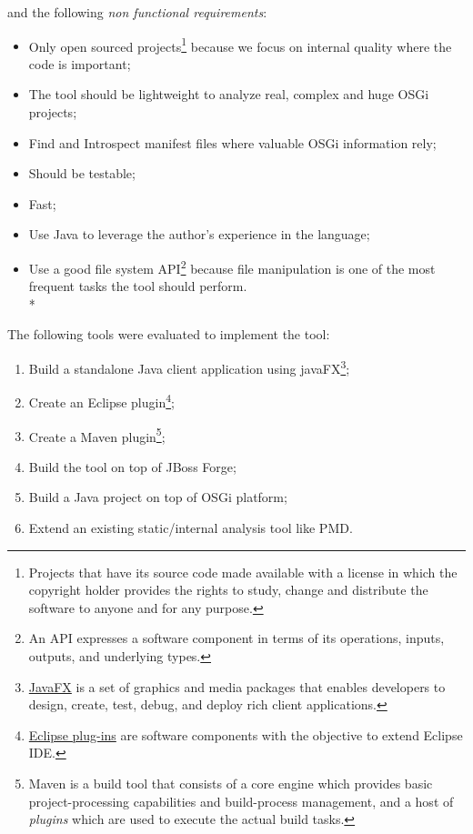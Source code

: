 and the following \emph{non functional requirements}:

\begin{itemize}
\item Only open sourced projects\footnote{Projects that have its source code made available with a license in which the copyright holder provides the rights to study, change and distribute the software to anyone and for any purpose.} because we focus on internal quality where the code is important;
\item The tool should be lightweight to analyze real, complex and huge OSGi projects;
\item Find and Introspect manifest files where valuable OSGi information rely; 
\item Should be testable;
\item Fast;
\item Use Java to leverage the author's experience in the language;
\item Use a good file system API\footnote{An API expresses a software component in terms of its operations, inputs, outputs, and underlying types.} because file manipulation is one of the most frequent tasks the tool should perform.\\*
\end{itemize}
 

The following tools were evaluated to implement the tool:

\begin{enumerate}
\item Build a standalone Java client application using javaFX\footnote{\href{http://docs.oracle.com/javase/8/javase-clienttechnologies.htm}{JavaFX} is a set of graphics and media packages that enables developers to design, create, test, debug, and deploy rich client applications.};
\item Create an Eclipse plugin\footnote{\href{https://wiki.eclipse.org/FAQ_What_is_a_plug-in\%3F}{Eclipse plug-ins} are software components with the objective to extend Eclipse IDE.};
\item Create a  Maven plugin\footnote{Maven is a build tool that consists of a core engine which provides basic project-processing capabilities and build-process management, and a host of \emph{plugins} which are used to execute the actual build tasks.};
\item Build the tool on top of JBoss Forge;
\item Build a Java project on top of OSGi platform; 
\item Extend an existing static/internal analysis tool like PMD.
\end{enumerate}

